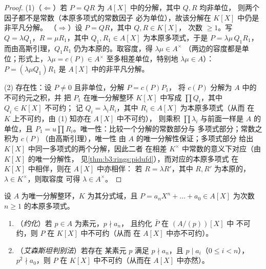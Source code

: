 \begin{proof}
(1)（$\Leftarrow$）若 $P = QR$ 为 $A[X]$ 中的分解，其中 $Q, R$ 均非单位，
则两个因子都不是常数（本原多项式的常数因子
必为单位），故该分解在 $K[X]$ 中仍是非平凡分解。
（$\Rightarrow$）设 $P = QR$，其中 $Q, R \in K[X]$，
次数 $\geq 1$。写 $Q = \lambda Q_1$，$R = \mu R_1$，其中 $Q_1, R_1
\in A[X]$ 为本原多项式，于是 $P = \lambda\mu\, Q_1R_1$，
而由高斯引理，$Q_1R_1$ 仍为本原的。取容度，得 $\lambda\mu \in A^\times$
（两边的容度都是单位；形式上，$\lambda\mu = c(P) \in
A^\times$ 至多相差单位，特别地 $\lambda \mu \in A$）：$P
= (\lambda\mu Q_1) R_1$ 是 $A[X]$ 中的非平凡分解。

(2) 存在性：设 $P \neq 0$ 且非单位，分解 $P = c(P)P_1$，
将 $c(P)$ 分解为 $A$ 中的不可约元之积，并
把 $P_1$ 在唯一分解整环 $K[X]$ 中写成 $\prod Q_i$，其中 $Q_i \in K[X]$ 不可约；
记 $Q_i = \lambda_i R_i$，其中 $R_i \in A[X]$ 为本原多项式（从而
在 $K$ 上不可约，由 (1) 知亦在 $A[X]$ 中不可约），
则乘积 $\prod \lambda_i$ 与前面一样是 $A$ 的单位，且 $P_1 = u\prod
R_i$。唯一性：比较一个分解的常数部分与
多项式部分；常数之积为 $c(P)$（由高斯引理），唯一性
由 $A$ 的唯一分解性保证；多项式部分
给出 $K[X]$ 中同一多项式的两个分解，因此二者
在相差 $K^\times$ 中常数的意义下对应（由 $K[X]$ 的唯一分解性，
见\cref{thm:b3:rings:pidufd}），而对应的本原多项式
在 $K[X]$ 中相伴，则在 $A[X]$ 中亦相伴：
若 $R = \lambda R'$，其中 $R, R'$ 为本原的，$\lambda \in K^\times$，则取容度
可得 $\lambda \in A^\times$。
\end{proof}

\begin{theorem}[不可约性判别法]\label{thm:b3:rings:criteria}
设 $A$ 为唯一分解整环，$K$ 为其分式域，且 $P = a_nX^n + \dots
+ a_0 \in A[X]$ 为次数 $n \geq 1$ 的本原多项式。
\begin{enumerate}
  \item （\emph{约化}）若 $p \in A$ 为素元，$p \nmid a_n$，
        且约化 $\bar P$ 在 $(A/(p))[X]$ 中
        不可约，则 $P$ 在 $K[X]$ 中不可约（从而
        在 $A[X]$ 中亦不可约）。
  \item （\emph{艾森斯坦判别法}）若存在
        某素元 $p$ 满足 $p \nmid a_n$，且 $p \mid a_i$（$0
        \leq i < n$），
        $p^2 \nmid a_0$，则 $P$ 在 $K[X]$ 中不可约（从而在 $A[X]$ 中亦然）。
\end{enumerate}
\end{theorem}

